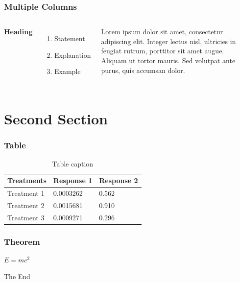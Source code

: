 \documentclass{beamer}
\begin{document}
\begin{frame}
\frametitle{Multiple Columns}
\begin{columns}[c] %

\textbf{Heading}
\begin{enumerate}
\item Statement
\item Explanation
\item Example
\end{enumerate}

Lorem ipsum dolor sit amet, consectetur adipiscing elit. Integer lectus nisl, ultricies in feugiat rutrum, porttitor sit amet augue. Aliquam ut tortor mauris. Sed volutpat ante purus, quis accumsan dolor.

\end{columns}
\end{frame}

\section{Second Section}

\begin{frame}
\frametitle{Table}
\begin{table}
\begin{tabular}{l l l}
\toprule
\textbf{Treatments} & \textbf{Response 1} & \textbf{Response 2}\\
\midrule
Treatment 1 & 0.0003262 & 0.562 \\
Treatment 2 & 0.0015681 & 0.910 \\
Treatment 3 & 0.0009271 & 0.296 \\
\bottomrule
\end{tabular}
\caption{Table caption}
\end{table}
\end{frame}


\begin{frame}
\frametitle{Theorem}
\begin{theorem}
$E = mc^2$
\end{theorem}
\end{frame}




\begin{frame}
\Huge{\centerline{The End}}
\end{frame}


\fi
\end{document}
